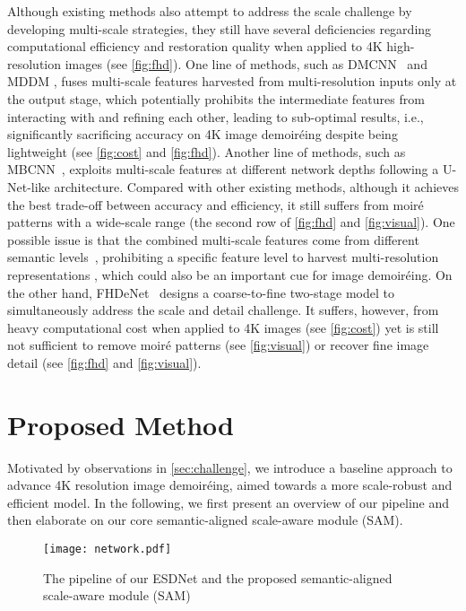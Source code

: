 \documentclass[runningheads]{llncs}
\newcommand{\ie}{i.e.}
\begin{document}
 Although existing methods also attempt to address the scale challenge by developing multi-scale strategies, they still have several deficiencies regarding computational efficiency and restoration quality when applied to 4K high-resolution images (see \cref{fig:fhd}). One line of methods, such as DMCNN~\cite{sun2018moire} and MDDM \cite{cheng2019multi}, fuses multi-scale features harvested from multi-resolution inputs only at the output stage, which potentially prohibits the intermediate features from interacting with and refining each other, leading to sub-optimal results, \ie, significantly sacrificing accuracy on 4K image demoiréing despite being lightweight (see \cref{fig:cost} and  \cref{fig:fhd}). 
Another line of methods, such as MBCNN~\cite{zheng2020image}, exploits multi-scale features at different network depths following a U-Net-like architecture. Compared with other existing methods, although it achieves the best trade-off between accuracy and efficiency, it still suffers from moiré patterns with a wide-scale range (the second row of \cref{fig:fhd} and \cref{fig:visual}). One possible issue is that the combined multi-scale features come from different semantic levels~\cite{wang2020deep}, prohibiting a specific feature level to harvest multi-resolution representations \cite{wang2020deep}, which could also be an important cue for image demoiréing.
On the other hand, FHDeNet~\cite{he2020fhde} designs a coarse-to-fine two-stage model to simultaneously address the scale and detail challenge. It suffers, however, from heavy computational cost when applied to 4K images (see \cref{fig:cost}) yet is still not sufficient to remove moiré patterns (see \cref{fig:visual}) or recover fine image detail (see  \cref{fig:fhd} and \cref{fig:visual}).


\section{Proposed Method}\label{sec:method}

Motivated by observations in \cref{sec:challenge}, we introduce a baseline approach to advance 4K resolution image demoiréing, aimed towards a more scale-robust and efficient model. In the following, we first present an overview of our pipeline and then elaborate on our core semantic-aligned scale-aware module (SAM).





\begin{figure*}[t]
    \texttt{[image: network.pdf]}
    \caption{The pipeline of our ESDNet and the proposed semantic-aligned scale-aware module (SAM) 
    }
    \label{fig:ESDNet}
\end{figure*}
\end{document}
